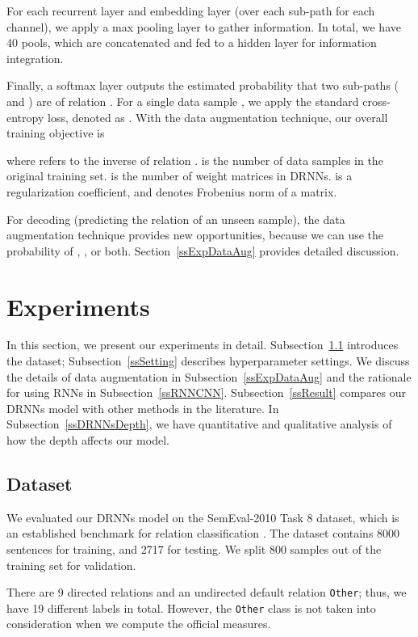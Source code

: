 \documentclass[11pt]{article}
\begin{document}
For each recurrent layer and embedding layer (over each sub-path for each channel), we apply a max pooling layer to gather information. In total, we have 40 pools, which are concatenated and fed to a hidden layer for information integration.

Finally, a softmax layer outputs the estimated probability that two sub-paths ( and ) are of relation . For a single data sample , we apply the standard cross-entropy loss, denoted as . With the data augmentation technique, our overall training objective is

where  refers to the inverse of relation .  is the number of data samples in the original training set.  is the number of weight matrices in DRNNs.  is a regularization coefficient, and  denotes Frobenius norm of a matrix.

For decoding (predicting the relation of an unseen sample), the data augmentation technique provides new opportunities, because we can use the probability of , , or both. Section~\ref{ssExpDataAug} provides detailed discussion.

\section{Experiments}\label{sExperiment}

In this section, we present our experiments in detail.
Subsection~\ref{ssData} introduces the dataset;
Subsection~\ref{ssSetting} describes hyperparameter settings.
We discuss the details of data augmentation in Subsection~\ref{ssExpDataAug} and
the rationale for using RNNs in Subsection~\ref{ssRNNCNN}.
Subsection~\ref{ssResult} compares our DRNNs model with other methods in the literature.
In Subsection~\ref{ssDRNNsDepth}, we have quantitative and qualitative analysis of how the depth affects our model.


\subsection{Dataset}\label{ssData}

We evaluated our DRNNs model on the SemEval-2010 Task 8 dataset, which is an established benchmark for relation classification \cite{2010SVM}. The dataset contains 8000 sentences for training, and 2717 for testing. We split 800 samples out of the training set for validation.

There are 9 directed relations and an undirected default relation \verb|Other|; thus, we have 19 different labels in total. However, the \verb|Other| class is not taken into consideration when we compute the official measures.
\end{document}
